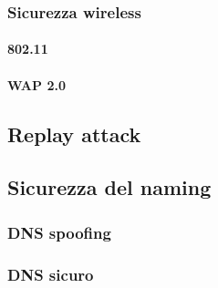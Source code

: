 \subsubsection{Sicurezza wireless} %

\paragraph{802.11}

\paragraph{WAP 2.0}

\subsection{Replay attack} %

\subsection{Sicurezza del naming} %

\subsubsection{DNS spoofing}

\subsubsection{DNS sicuro}

